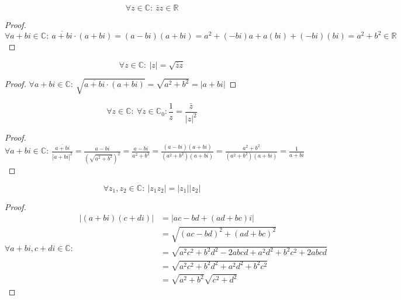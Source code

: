 \documentclass[main.tex]{subfiles}
\begin{document}
\begin{pr}
  \[ \forall z\in \mathbb{C}:\ \bar{z}z\in \mathbb{R} \]

  \begin{proof}
    $\forall a+bi\in \mathbb{C}:\  \overline{a+bi}\cdot(a+bi) = (a-bi)(a+bi) = a^{2} + (-bi)a + a(bi) + (-bi)(bi) = a^{2} + b^{2} \in \mathbb{R}$
  \end{proof}
\end{pr}

\begin{pr}
  \[ \forall z\in \mathbb{C}:\ |z| = \sqrt{\bar{z}z} \]

  \begin{proof}
    $\forall a+bi\in \mathbb{C}:\ \sqrt{\overline{a+bi}\cdot(a+bi)} = \sqrt{a^{2}+b^{2}} = |a+bi|$
  \end{proof}
\end{pr}

\begin{pr}
  \[ \forall z\in \mathbb{C}:\ \forall z \in \mathbb{C}_{0}: \frac{1}{z} = \frac{\bar{z}}{|z|^{2}} \]

  \begin{proof}
    $\forall a+bi\in \mathbb{C}:\ \frac{\overline{a+bi}}{|a+bi|^{2}} = \frac{a-bi}{\left(\sqrt{a^{2}+b^{2}}\right)^{2}} = \frac{a-bi}{a^{2}+b^{2}}= \frac{(a-bi)(a+bi)}{(a^{2}+b^{2})(a+bi)} = \frac{a^{2}+b^{2}}{(a^{2}+b^{2})(a+bi)} = \frac{1}{a+bi}$
  \end{proof}
\end{pr}

\begin{pr}
  \[ \forall z_{1},z_{2}\in \mathbb{C}:\ |z_{1}z_{2}| = |z_{1}||z_{2}| \]

  \begin{proof}
    \[
    \forall a+bi,c+di \in \mathbb{C}:\
    \begin{array}{rll}
      |(a+bi)(c+di)| &= |ac-bd + (ad+bc)i|\\
      &= \sqrt{(ac-bd)^{2} + (ad+bc)^{2}}\\
      &= \sqrt{a^{2}c^{2} +b^{2}d^{2}-2abcd + a^{2}d^{2} + b^{2}c^{2} +2abcd}\\
      &= \sqrt{a^{2}c^{2} +b^{2}d^{2} + a^{2}d^{2} + b^{2}c^{2}}\\
      &= \sqrt{a^{2}+b^{2}}\sqrt{c^{2}+d^{2}}
    \end{array}
    \]
  \end{proof}
\end{pr}
\end{document}
